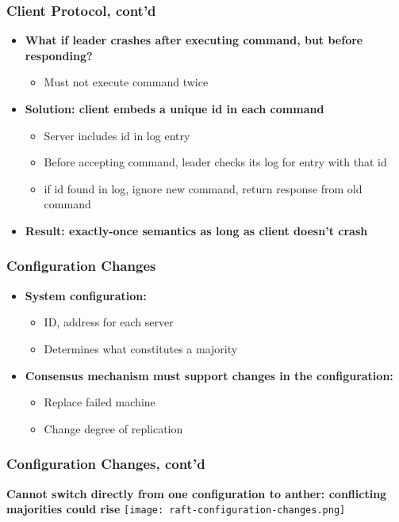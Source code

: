 \begin{frame}
    \frametitle{Client Protocol, cont'd}
    \begin{itemize}
        \item \textbf{What if leader crashes after executing command, but before responding?}
            \begin{itemize}
                \item Must not execute command twice
            \end{itemize}
        \item \textbf{Solution: client embeds a unique id in each command}
            \begin{itemize}
                \item Server includes id in log entry
                \item Before accepting command, leader checks its log for entry with that id
                \item if id found in log, ignore new command, return response from old command
            \end{itemize}
        \item \textbf{Result: exactly-once semantics as long as client doesn't crash}
    \end{itemize}
\end{frame}

\begin{frame}
    \frametitle{Configuration Changes}
    \begin{itemize}
        \item \textbf{System configuration:}
            \begin{itemize}
                \item ID, address for each server
                \item Determines what constitutes a majority
            \end{itemize}
        \item \textbf{Consensus mechanism must support changes in the configuration:}
            \begin{itemize}
                \item Replace failed machine
                \item Change degree of replication
            \end{itemize}
    \end{itemize}
\end{frame}

\begin{frame}
    \frametitle{Configuration Changes, cont'd}
    \textbf{Cannot switch directly from one configuration to anther: \alert{conflicting majorities} could rise}
    \texttt{[image: raft-configuration-changes.png]}
\end{frame}

